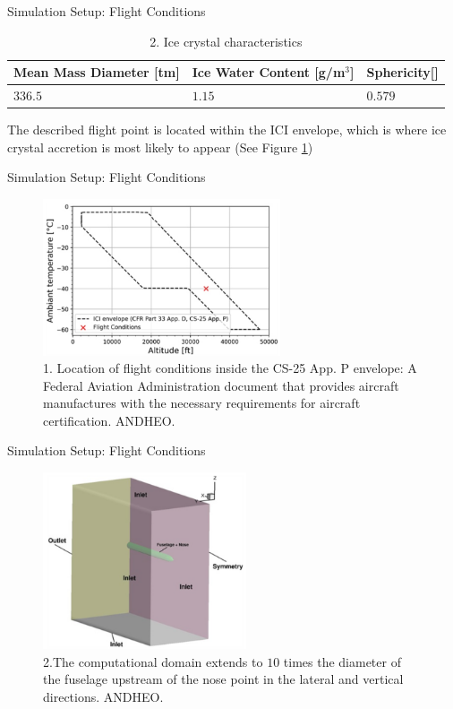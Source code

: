 \documentclass[aspectratio=169,xcolor=dvipsnames]{beamer}
\begin{document}
\begin{frame}{Simulation Setup: Flight Conditions}
   \begin{table}[H]
\begin{tabular}{lll}
\hline
\multicolumn{1}{|l|}{Mean Mass Diameter [tm]} & \multicolumn{1}{l|}{Ice Water Content [g/m$^3$]} & \multicolumn{1}{l|}{Sphericity[]} \\ \hline
\multicolumn{1}{|l|}{$336.5$} & \multicolumn{1}{l|}{$1.15$} & \multicolumn{1}{l|}{$0.579$} \\ \hline 
\end{tabular}
\caption{2. Ice crystal characteristics}
\label{Tab2}
\end{table}
The described flight point is located within the ICI envelope, which is where ice crystal accretion is most likely to appear (See Figure \ref{Fig1})
\end{frame}


\begin{frame}{Simulation Setup: Flight Conditions}
   \begin{figure}[h]
\includegraphics[width=7cm]{images/ICI_loc.png}
\caption{1. Location of flight conditions inside the CS-25 App. P envelope: A Federal Aviation Administration document that provides aircraft manufactures with the necessary requirements for aircraft certification. \textcopyright ANDHEO.}
\label{Fig1}
\end{figure}
\end{frame}

\begin{frame}{Simulation Setup: Flight Conditions}
   \begin{figure}[h]
\includegraphics[width=6cm]{images/domain.png}
\caption{2.The computational domain extends to $10$ times the diameter of the fuselage upstream of the nose point in the lateral and vertical directions. \textcopyright ANDHEO.}
\label{Fig2}
\end{figure}
\end{frame}
\end{document}
